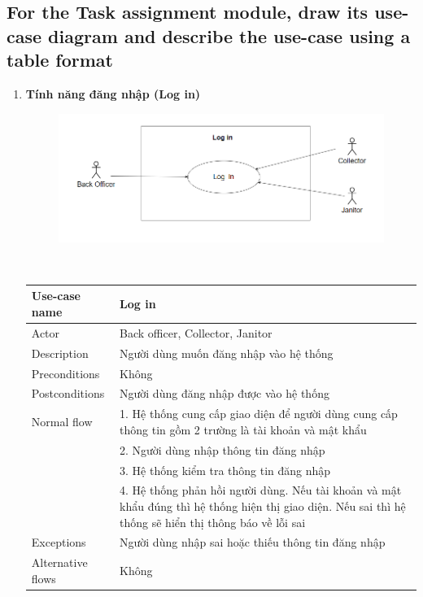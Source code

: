 \documentclass[a4paper]{article}
\begin{document}
\subsection{For the Task assignment module, draw its use-case diagram and describe the use-case using a table format}
\begin{enumerate}

\renewcommand{\labelenumi}{\alph{enumi})}
\newpage
\item \textbf{Tính năng đăng nhập (Log in)}
\begin{figure}[!h]
    \begin{center}
      \includegraphics[width=6in]{Image/login.png}
    \end{center}
\end{figure}
\\
\begin{tabular}{|p{3cm}|p{10cm}|}
     \hline
     Use-case name & Log in\\
     \hline
     Actor & Back officer, Collector, Janitor\\
     \hline
     Description & Người dùng muốn đăng nhập vào hệ thống \\
     
     \hline
     Preconditions & Không \\
          \hline
     Postconditions & Người dùng đăng nhập được vào hệ thống \\
     \hline
     Normal flow & 1. Hệ thống cung cấp giao diện để người dùng cung cấp thông tin gồm 2 trường là tài khoản và mật khẩu \\
     & 2. Người dùng nhập thông tin đăng nhập  \\
     & 3. Hệ thống kiểm tra thông tin đăng nhập \\
     & 4. Hệ thống phản hồi người dùng. Nếu tài khoản và mật khẩu đúng thì hệ thống hiện thị giao diện. Nếu sai thì hệ thống sẽ hiển thị thông báo về lỗi sai\\
     \hline
     Exceptions & Người dùng nhập sai hoặc thiếu thông tin đăng nhập\\
     \hline
     Alternative flows & Không\\
     \hline
\end{tabular}
\vspace{0.5cm}


\end{enumerate}
\end{document}
